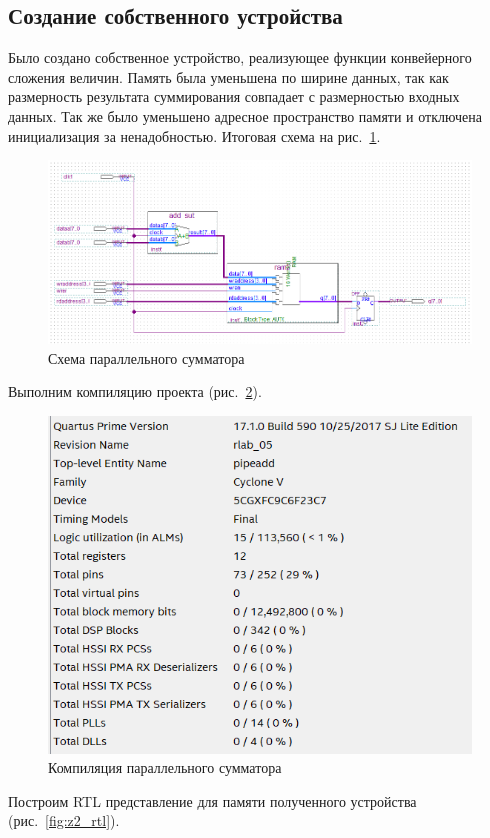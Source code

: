 \documentclass[a4paper,14pt]{article}
\begin{document}
\subsection{Создание собственного устройства}

Было создано собственное устройство, реализующее функции конвейерного сложения величин.
Память была уменьшена по ширине данных, так как размерность результата суммирования совпадает с размерностью входных данных.
Так же было уменьшено адресное пространство памяти и отключена инициализация за ненадобностью.
Итоговая схема на рис.~\ref{fig:z2_schema}.

\begin{figure}[H]
	\centering
	\includegraphics[width=\linewidth]{image/z2_schema}
	\caption{Схема параллельного сумматора}
	\label{fig:z2_schema}
\end{figure}

Выполним компиляцию проекта (рис.~\ref{fig:z2_report}).

\begin{figure}[H]
	\centering
	\includegraphics[width=0.5\linewidth]{image/z2_report}
	\caption{Компиляция параллельного сумматора}
	\label{fig:z2_report}
\end{figure}

Построим RTL представление для памяти полученного устройства (рис.~\ref{fig:z2_rtl}).
\end{document}
